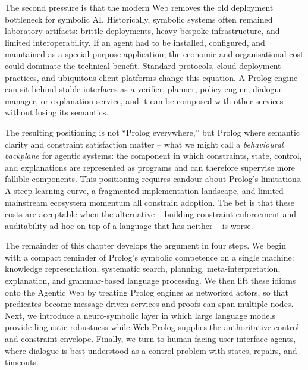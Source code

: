The second pressure is that the modern Web removes the old deployment bottleneck for symbolic AI. Historically, symbolic systems often remained laboratory artifacts: brittle deployments, heavy bespoke infrastructure, and limited interoperability. If an agent had to be installed, configured, and maintained as a special-purpose application, the economic and organisational cost could dominate the technical benefit. Standard protocols, cloud deployment practices, and ubiquitous client platforms change this equation. A Prolog engine can sit behind stable interfaces as a verifier, planner, policy engine, dialogue manager, or explanation service, and it can be composed with other services without losing its semantics.

The resulting positioning is not ``Prolog everywhere,'' but Prolog where semantic clarity and constraint satisfaction matter -- what we might call a \emph{behavioural backplane} for agentic systems: the component in which constraints, state, control, and explanations are represented as programs and can therefore supervise more fallible components. This positioning requires candour about Prolog's limitations. A steep learning curve, a fragmented implementation landscape, and limited mainstream ecosystem momentum all constrain adoption. The bet is that these costs are acceptable when the alternative -- building constraint enforcement and auditability ad hoc on top of a language that has neither -- is worse.

\medskip

\noindent The remainder of this chapter develops the argument in four steps. We begin with a compact reminder of Prolog's symbolic competence on a single machine: knowledge representation, systematic search, planning, meta-interpretation, explanation, and grammar-based language processing. We then lift these idioms onto the Agentic Web by treating Prolog engines as networked actors, so that predicates become message-driven services and proofs can span multiple nodes. Next, we introduce a neuro-symbolic layer in which large language models provide linguistic robustness while Web Prolog supplies the authoritative control and constraint envelope. Finally, we turn to human-facing user-interface agents, where dialogue is best understood as a control problem with states, repairs, and timeouts.



